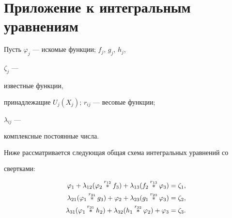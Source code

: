 \section{Приложение к интегральным уравнениям}





Пусть $\varphi_j$ --- искомые функции; $f_j$, $g_j$, $h_j$,


$\zeta_j$ ---


известные функции,


принадлежащие $U_j(X_j)$; $r_{ij}$ --- весовые функции;


$\lambda_{ij}$ ---


комплексные постоянные числа.





Ниже рассматривается следующая общая схема интегральных уравнений со


свертками:


\begin{equation}


\begin{split}


\varphi_1+\lambda_{12}(\varphi_2\up{r_{12}}{}f_3)+


\lambda_{13}(f_2\up{r_{13}}{}\varphi_3)&=\zeta_1,\\


\lambda_{21}(\varphi_1\up{r_{21}}{}g_3)+\varphi_2+


\lambda_{23}(g_1\up{r_{23}}{}\varphi_3)&=\zeta_2,\\


\lambda_{31}(\varphi_1\up{r_{31}}{}h_2)+\lambda_{32}


(h_1\up{r_{32}}{}\varphi_2)+\varphi_3&=\zeta_3.


\end{split}


\end{equation}





